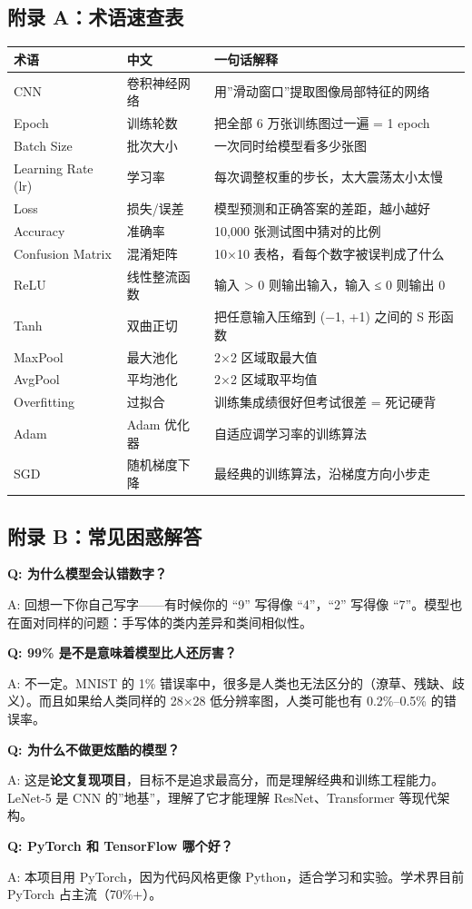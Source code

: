 \documentclass[
  11pt,
]{ctexart}
\newcounter{none} %
\begin{document}
\subsection{附录
A：术语速查表}\label{ux9644ux5f55-aux672fux8bedux901fux67e5ux8868}

{\def\LTcaptype{none} %
\begin{longtable}[]{@{}lll@{}}
\toprule\noalign{}
术语 & 中文 & 一句话解释 \\
\midrule\noalign{}
\endhead
\bottomrule\noalign{}
\endlastfoot
CNN & 卷积神经网络 & 用”滑动窗口”提取图像局部特征的网络 \\
Epoch & 训练轮数 & 把全部 6 万张训练图过一遍 = 1 epoch \\
Batch Size & 批次大小 & 一次同时给模型看多少张图 \\
Learning Rate (lr) & 学习率 & 每次调整权重的步长，太大震荡太小太慢 \\
Loss & 损失/误差 & 模型预测和正确答案的差距，越小越好 \\
Accuracy & 准确率 & 10,000 张测试图中猜对的比例 \\
Confusion Matrix & 混淆矩阵 & 10×10 表格，看每个数字被误判成了什么 \\
ReLU & 线性整流函数 & 输入 \textgreater{} 0 则输出输入，输入 ≤ 0 则输出
0 \\
Tanh & 双曲正切 & 把任意输入压缩到 (−1, +1) 之间的 S 形函数 \\
MaxPool & 最大池化 & 2×2 区域取最大值 \\
AvgPool & 平均池化 & 2×2 区域取平均值 \\
Overfitting & 过拟合 & 训练集成绩很好但考试很差 = 死记硬背 \\
Adam & Adam 优化器 & 自适应调学习率的训练算法 \\
SGD & 随机梯度下降 & 最经典的训练算法，沿梯度方向小步走 \\
\end{longtable}
}

\subsection{附录
B：常见困惑解答}\label{ux9644ux5f55-bux5e38ux89c1ux56f0ux60d1ux89e3ux7b54}

\textbf{Q: 为什么模型会认错数字？}

A: 回想一下你自己写字——有时候你的 “9” 写得像 “4”，“2” 写得像
“7”。模型也在面对同样的问题：手写体的类内差异和类间相似性。

\textbf{Q: 99\% 是不是意味着模型比人还厉害？}

A: 不一定。MNIST 的 1\%
错误率中，很多是人类也无法区分的（潦草、残缺、歧义）。而且如果给人类同样的
28×28 低分辨率图，人类可能也有 0.2\%–0.5\% 的错误率。

\textbf{Q: 为什么不做更炫酷的模型？}

A:
这是\textbf{论文复现项目}，目标不是追求最高分，而是理解经典和训练工程能力。LeNet-5
是 CNN 的”地基”，理解了它才能理解 ResNet、Transformer 等现代架构。

\textbf{Q: PyTorch 和 TensorFlow 哪个好？}

A: 本项目用 PyTorch，因为代码风格更像 Python，适合学习和实验。学术界目前
PyTorch 占主流（70\%+）。
\end{document}
